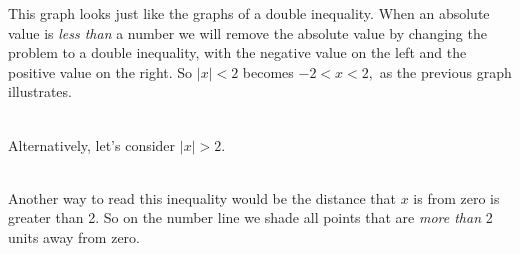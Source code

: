 \documentclass[12pt]{article}
\theoremstyle{definition}
\begin{document}
This graph looks just like the graphs of a double inequality.  When an absolute value is {\it less than} a number we will remove the
absolute value by changing the problem to a double inequality, with the negative value on the left and the positive value on the right. So $|x| < 2$ becomes $- 2 < x < 2,$ as the previous graph illustrates.\\
\ \par
Alternatively, let's consider $|x| > 2$.\\
\ \par
Another way to read this inequality would be the distance that $x$ is from zero is greater than 2. So on the number line we shade all points that are {\it more than} 2 units away from zero.%

\begin{center}
\end{center}
\end{document}
